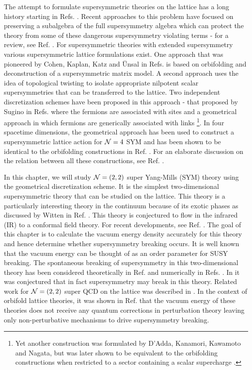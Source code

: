The attempt to formulate supersymmetric theories on the lattice has a long history starting in Refs. \cite{Elitzur:1982vh, Banks:1982ut, Sakai:1983dg, Kostelecky:1983qu, Aratyn:1984bc, Scott:1983ha}. Recent approaches to this problem have focused on preserving a subalgebra of the full supersymmetry algebra which can protect the theory from some of these dangerous supersymmetry violating terms - for a review, see Ref. \cite{Catterall:2009it}. For supersymmetric theories with extended supersymmetry various supersymmetric lattice formulations exist. One approach that was pioneered by Cohen, Kaplan, Katz and \"Unsal in Refs. \cite{Cohen:2003xe, Cohen:2003qw, Kaplan:2005ta} is based on orbifolding and deconstruction of a supersymmetric matrix model. A second approach uses the idea of topological twisting to isolate appropriate nilpotent scalar supersymmetries that can be transferred to the lattice. Two independent discretization schemes have been proposed in this approach - that proposed by Sugino in Refs. \cite{Sugino:2003yb, Sugino:2004qd} where the fermions are associated with sites and  a geometrical approach in which fermions are generically associated with links \cite{Catterall:2003wd}\footnote{Yet another construction was formulated by D'Adda, Kanamori, Kawamoto and Nagata, \cite{DAdda:2005rcd} but was later shown to be equivalent to the orbifolding constructions when restricted to a sector containing a scalar supercharge \cite{Damgaard:2007eh}.}. In four spacetime dimensions, the geometrical approach has been used to construct  a supersymmetric lattice action for $\mathcal N = 4$ SYM  \cite{Catterall:2005fd, Catterall:2014vka} and has been shown to be identical to the orbifolding constructions in Ref. \cite{Unsal:2006qp,Catterall:2007kn}. For an elaborate discussion on the relation between all these constructions, see Ref. \cite{Takimi:2007nn}. 

In this chapter, we will study $\mathcal N = (2, 2)$ super Yang-Mills (SYM) theory using the geometrical discretization scheme. It is the simplest two-dimensional supersymmetric theory that can be studied on the lattice. This theory is a particularly interesting theory in the continuum because of its exotic phases as discussed by Witten in Ref. \cite{Witten:1993yc}. This theory is conjectured to flow in the infrared (IR) to a conformal field theory. For recent developments, see Ref. \cite{Park:2016dpb}. The goal  of this chapter is to calculate the vacuum energy density accurately for this theory and hence determine whether supersymmetry breaking occurs. It is well known \cite{Witten:1981nf} that the vacuum energy can be thought of as an order parameter for  SUSY breaking. The spontaneous breaking of supersymmetry in this two-dimensional theory has been considered theoretically in Ref. \cite{Hori:2006dk} and numerically in Refs. \cite{Kanamori:2009dk, Kanamori:2007yx}. In \cite{Hori:2006dk} it was conjectured that in fact supersymmetry may break in this theory. Related work for $\mathcal N = (2, 2)$ super QCD on the lattice was described in \cite{Catterall:2015tta}. In the context of orbifold lattice theories, it was shown in Ref. \cite{Matsuura:2007ec} that the vacuum energy of these theories does not receive any quantum corrections in perturbation theory leaving only non-perturbative mechanisms to drive supersymmetry breaking.

